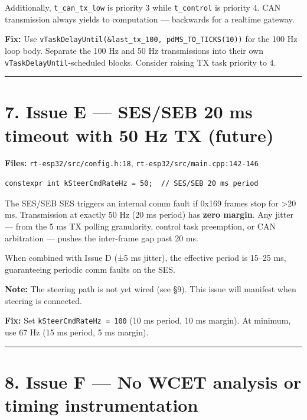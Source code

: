 \documentclass[12pt,a4paper,oneside]{report}
\begin{document}
Additionally, \texttt{t\_can\_tx\_low} is priority 3 while \texttt{t\_control}
is priority 4. CAN transmission always yields to computation --- backwards for a
realtime gateway.

\textbf{Fix:} Use
\texttt{vTaskDelayUntil(\&last\_tx\_100,\ pdMS\_TO\_TICKS(10))} for the 100 Hz
loop body. Separate the 100 Hz and 50 Hz transmissions into their own
\texttt{vTaskDelayUntil}-scheduled blocks. Consider raising TX task priority to
4.

\begin{center}\rule{0.5\linewidth}{0.5pt}\end{center}

\section{7. Issue E --- SES/SEB 20 ms timeout with 50 Hz TX
(future)}\label{issue-e-SES/SEB-20-ms-timeout-with-50-hz-tx-future}

\textbf{Files:} \texttt{rt-esp32/src/config.h:18},
\texttt{rt-esp32/src/main.cpp:142-146}

\begin{verbatim}
constexpr int kSteerCmdRateHz = 50;  // SES/SEB 20 ms period
\end{verbatim}

The SES/SEB SES triggers an internal comm fault if 0x169 frames stop for
\textgreater20 ms. Transmission at exactly 50 Hz (20 ms period) has \textbf{zero
margin}. Any jitter --- from the 5 ms TX polling granularity, control task
preemption, or CAN arbitration --- pushes the inter-frame gap past 20 ms.

When combined with Issue D (±5 ms jitter), the effective period is 15--25 ms,
guaranteeing periodic comm faults on the SES.

\textbf{Note:} The steering path is not yet wired (see §9). This issue will
manifest when steering is connected.

\textbf{Fix:} Set \texttt{kSteerCmdRateHz\ =\ 100} (10 ms period, 10 ms margin).
At minimum, use 67 Hz (15 ms period, 5 ms margin).

\begin{center}\rule{0.5\linewidth}{0.5pt}\end{center}

\section{8. Issue F --- No WCET analysis or timing
instrumentation}\label{issue-f-no-wcet-analysis-or-timing-instrumentation}
\end{document}
